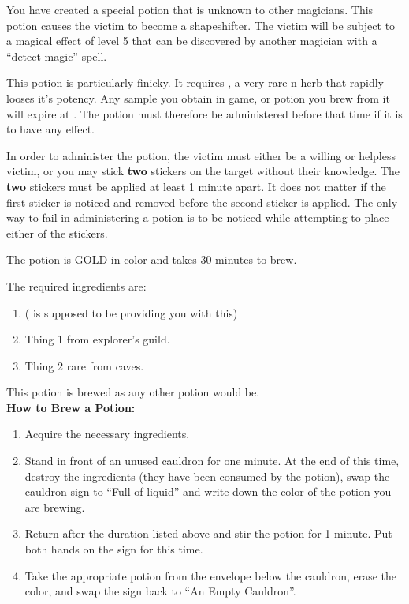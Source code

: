 \documentclass[green]{NeptuneBall}
\begin{document}
\name{\gShapeshifter{}}

You have created a special potion that is unknown to other magicians. This potion causes the victim to become a shapeshifter. The victim will be subject to a magical effect of level 5 that can be discovered by another magician with a ``detect magic'' spell.

This potion is particularly finicky. It requires \iHemlock{}, a very rare \pPacifica{}n herb that rapidly looses it's potency. Any sample you obtain in game, or potion you brew from it will expire at \cTThree{\MYname{}}. The potion must therefore be administered before that time if it is to have any effect.

In order to administer the potion, the victim must either be a willing or helpless victim, or you may stick {\bf two} stickers on the target without their knowledge. The {\bf two} stickers must be applied at least 1 minute apart. It does not matter if the first sticker is noticed and removed before the second sticker is applied. The only way to fail in administering a potion is to be noticed while attempting to place either of the stickers.

The potion is GOLD in color and takes 30 minutes to brew. 

The required ingredients are:
\begin{enumerate}
\item \iHemlock{} (\cSpy{} is supposed to be providing you with this)
\item Thing 1 from explorer's guild.
\item Thing 2 rare from caves.
\end{enumerate}

This potion is brewed as any other potion would be.\\

{\bf How to Brew a Potion:}\\ %
\begin{enumerate}
  \item Acquire the necessary ingredients.
  \item Stand in front of an unused cauldron for one minute. At the end of this time, destroy the ingredients (they have been consumed by the potion), swap the cauldron sign to ``Full of liquid'' and write down the color of the potion you are brewing.
  \item Return after the duration listed above and stir the potion for 1 minute. Put both hands on the sign for this time.
  \item Take the appropriate potion from the envelope below the cauldron, erase the color, and swap the sign back to ``An Empty Cauldron''.
\end{enumerate}
\end{document}
